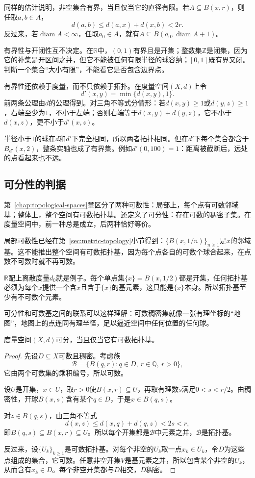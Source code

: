 同样的估计说明，非空集合有界，当且仅当它的直径有限。若$A\subseteq B(x,r)$，则任取$a,b\in A$，
\[
d(a,b)\leq d(a,x)+d(x,b)<2r.
\]
反过来，若$\operatorname{diam}A<\infty$，任取$a_0\in A$，就有$A\subseteq B(a_0,\operatorname{diam}A+1)$。

有界性与开闭性互不决定。在$\mathbb R$中，$(0,1)$有界且是开集；整数集$\mathbb Z$是闭集，因为它的补集是开区间之并，但它不能被任何有限半径的球容纳；$[0,1]$既有界又闭。判断一个集合“大小有限”，不能看它是否包含边界点。

有界性还依赖于度量，而不只依赖于拓扑。在度量空间$(X,d)$上令
\[
d'(x,y)=\min\{d(x,y),1\}.
\]
前两条公理由$d$的公理得到。对三角不等式分情形：若$d(x,y)\geq1$或$d(y,z)\geq1$，右端至少为$1$，不小于左端；否则右端等于$d(x,y)+d(y,z)$，它不小于$d(x,z)$，更不小于$d'(x,z)$。

半径小于$1$的球在$d$和$d'$下完全相同，所以两者拓扑相同。但在$d'$下每个集合都含于$B_{d'}(x,2)$，整条实轴也成了有界集。例如$d'(0,100)=1$：距离被截断后，远处的点看起来也不远。

\subsection{可分性的判据}
\label{sec:metric-separability}

第~\ref{chap:topological-spaces}章区分了两种可数性：局部上，每个点有可数邻域基；整体上，整个空间有可数拓扑基。还定义了可分性：存在可数的稠密子集。在度量空间中，前一种总是成立，后两种恰好等价。

局部可数性已经在第~\ref{sec:metric-topology}小节得到：$\{B(x,1/n)\}_{n\geq1}$是$x$的邻域基。这不能推出整个空间有可数拓扑基，因为每个点各自的可数个球合起来，在点数不可数时就不再可数。

$\mathbb R$配上离散度量$d_0$就是例子。每个单点集$\{x\}=B(x,1/2)$都是开集，任何拓扑基必须为每个$x$提供一个含$x$且含于$\{x\}$的基元素，这只能是$\{x\}$本身。所以拓扑基至少有不可数个元素。

可分性和可数基之间的联系可以这样理解：可数稠密集就像一张有理坐标的“地图”，地图上的点连同有理半径，足以逼近空间中任何位置的任何球。

\begin{theorem}[度量空间的可分性]
\label{thm:metric-separable-second-countable}
度量空间$(X,d)$可分，当且仅当它有可数拓扑基。
\end{theorem}

\begin{proof}
先设$D\subseteq X$可数且稠密。考虑族
\[
\mathcal B=\{B(q,r):q\in D,\ r\in\mathbb Q,\ r>0\},
\]
它由两个可数集的乘积编号，所以可数。

设$U$是开集，$x\in U$，取$r>0$使$B(x,r)\subseteq U$，再取有理数$s$满足$0<s<r/2$。由稠密性，开球$B(x,s)$含有某个$q\in D$，于是$x\in B(q,s)$。

对$z\in B(q,s)$，由三角不等式
\[
d(x,z)\leq d(x,q)+d(q,z)<2s<r,
\]
即$B(q,s)\subseteq B(x,r)\subseteq U$。所以每个开集都是$\mathcal B$中元素之并，$\mathcal B$是拓扑基。

反过来，设$\{U_k\}_{k\geq1}$是可数拓扑基。对每个非空的$U_k$取一点$x_k\in U_k$，令$D$为这些点组成的集合，它可数。任意非空开集$V$是基元素之并，所以包含某个非空的$U_k$，从而含有$x_k\in D$。每个非空开集都与$D$相交，$D$稠密。
\end{proof}

